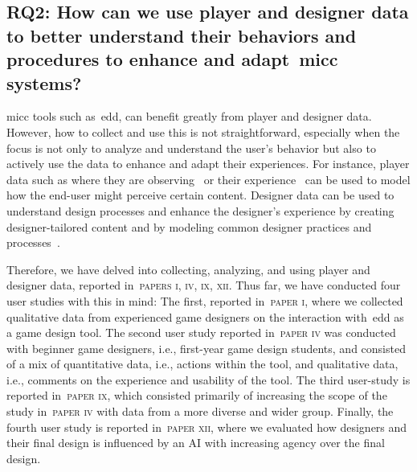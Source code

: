 
\subsection[Research Question 2]{RQ2: How can we use player and designer data to better understand their behaviors and procedures to enhance and adapt~\acrlong{micc} systems?}

\acrlong{micc} tools such as~\acrshort{edd}, can benefit greatly from player and designer data. However, how to collect and use this is not straightforward, especially when the focus is not only to analyze and understand the user's behavior but also to actively use the data to enhance and adapt their experiences. For instance, player data such as where they are observing~\cite{makantasis_pixels_2019} or their experience~\cite{yannakakis_experience-driven_2011} can be used to model how the end-user might perceive certain content. Designer data can be used to understand design processes and enhance the designer's experience by creating designer-tailored content and by modeling common designer practices and processes~\cite{liapis_designer_2013}.

Therefore, we have delved into collecting, analyzing, and using player and designer data, reported in~\textsc{papers i, iv, ix, xii}. Thus far, we have conducted four user studies with this in mind: The first, reported in~\textsc{paper i}, where we collected qualitative data from experienced game designers on the interaction with~\acrshort{edd} as a game design tool. The second user study reported in~\textsc{paper iv} was conducted with beginner game designers, i.e., first-year game design students, and consisted of a mix of quantitative data, i.e., actions within the tool, and qualitative data, i.e., comments on the experience and usability of the tool. The third user-study is reported in~\textsc{paper ix}, which consisted primarily of increasing the scope of the study in~\textsc{paper iv} with data from a more diverse and wider group. Finally, the fourth user study is reported in~\textsc{paper xii}, where we evaluated how designers and their final design is influenced by an AI with increasing agency over the final design.

